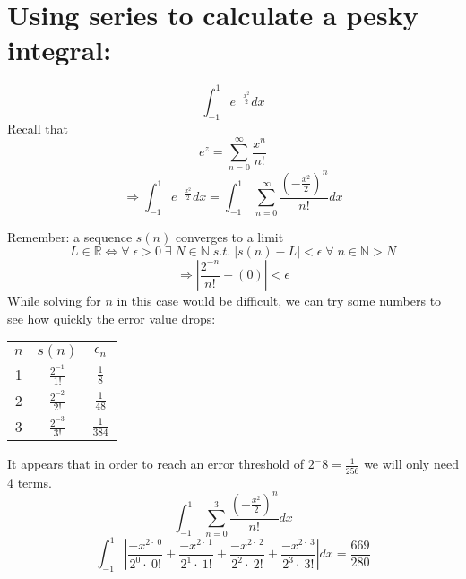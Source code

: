 \documentclass{article}
\begin{document}
\section{Using series to calculate a pesky integral:}
\[\int _{-1 }^{1 \:}e^{-\frac{x^2}{2}}dx\]
Recall that
\[e^z= \sum_{n=0}^{\infty}\frac{x^n}{n!}\]
\[\Rightarrow \int _{-1 }^{1 \:}e^{-\frac{x^2}{2}}dx=\int _{-1 \:}^{1 \:\:}\sum_{n=0}^{\infty}\frac{(-\frac{x^2}{2})^n}{n!} dx \]

Remember: a sequence $s(n)$ converges to a limit
\[L \in\mathbb{R}\iff\forall \; \epsilon > 0  \; \exists \; N \in \mathbb{N} \; s.t. \; |s(n) - L| < \epsilon \; \forall \; n \in \mathbb{N} > N\]
\[ \Rightarrow |\frac{2^{-n}}{n!} - (0)| < \epsilon\]
While solving for $n$ in this case would be difficult, we can try some numbers to see how quickly the error value drops:
\begin{center}
    \begin{tabular}{||c | c | c||}
        \hline
        $n$ & $s(n)$              & $\epsilon_n$    \\ [0.5ex]
        1   & $\frac{2^{-1}}{1!}$ & $\frac{1}{8}$   \\
        2   & $\frac{2^{-2}}{2!}$ & $\frac{1}{48}$  \\
        3   & $\frac{2^{-3}}{3!}$ & $\frac{1}{384}$ \\ [1ex]
        \hline
    \end{tabular}
\end{center}
It appears that in order to reach an error threshold of $2^-8 = \frac{1}{256}$ we will only need 4 terms.
\[\int _{-1 \:}^{1 \:\:}\sum_{n=0}^{3}\frac{(-\frac{x^2}{2})^n}{n!} dx \]
\[\int _{-1}^1\left|\frac{-x^{2\cdot \:0}}{2^0\cdot \:0!}+\frac{-x^{2\cdot \:1}}{2^1\cdot \:1!}+\frac{-x^{2\cdot \:2}}{2^2\cdot \:2!}+\frac{-x^{2\cdot \:3}}{2^3\cdot \:3!}\right|dx=\frac{669}{280}\]
\end{document}
